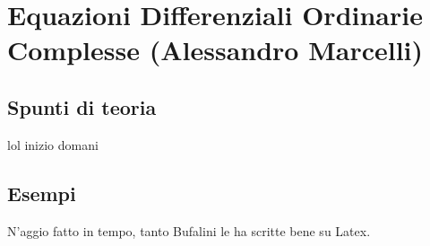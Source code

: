 \section{Equazioni Differenziali Ordinarie Complesse (Alessandro Marcelli)}

\subsection{Spunti di teoria}

lol inizio domani

\subsection{Esempi}
N'aggio fatto in tempo, tanto Bufalini le ha scritte bene su Latex.